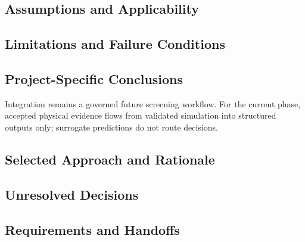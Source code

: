 
\subsection{Assumptions and Applicability}
\label{sec:res-ml-int-assumptions}


\subsection{Limitations and Failure Conditions}
\label{sec:res-ml-int-limitations}


\subsection{Project-Specific Conclusions}
\label{sec:res-ml-int-conclusions}

Integration remains a governed future screening workflow. For the
current phase, accepted physical evidence flows from validated
simulation into structured outputs only; surrogate predictions do not
route decisions.

\subsection{Selected Approach and Rationale}
\label{sec:res-ml-int-selected-approach}


\subsection{Unresolved Decisions}
\label{sec:res-ml-int-unresolved-decisions}


\subsection{Requirements and Handoffs}
\label{sec:res-ml-int-requirements}

